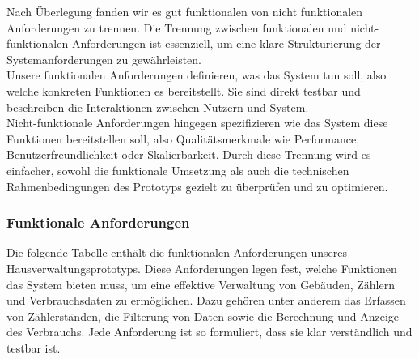 Nach Überlegung fanden wir es gut funktionalen von nicht funktionalen Anforderungen zu trennen.
Die Trennung zwischen funktionalen und nicht-funktionalen Anforderungen ist essenziell, um eine klare Strukturierung der Systemanforderungen zu gewährleisten.\\

Unsere funktionalen Anforderungen definieren, was das System tun soll, also welche konkreten Funktionen es bereitstellt.
Sie sind direkt testbar und beschreiben die Interaktionen zwischen Nutzern und System.\\

Nicht-funktionale Anforderungen hingegen spezifizieren wie das System diese Funktionen bereitstellen soll, also Qualitätsmerkmale wie Performance, Benutzerfreundlichkeit oder Skalierbarkeit.
Durch diese Trennung wird es einfacher, sowohl die funktionale Umsetzung als auch die technischen Rahmenbedingungen des Prototyps gezielt zu überprüfen und zu optimieren.

\subsubsection{Funktionale Anforderungen}

Die folgende Tabelle enthält die funktionalen Anforderungen unseres Hausverwaltungsprototyps.
Diese Anforderungen legen fest, welche Funktionen das System bieten muss, um eine effektive Verwaltung von Gebäuden, Zählern und Verbrauchsdaten zu ermöglichen.
Dazu gehören unter anderem das Erfassen von Zählerständen, die Filterung von Daten sowie die Berechnung und Anzeige des Verbrauchs.
Jede Anforderung ist so formuliert, dass sie klar verständlich und testbar ist.

